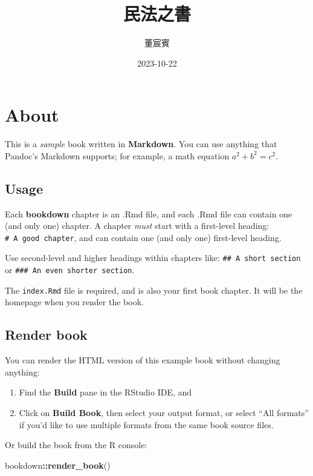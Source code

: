 \documentclass[
]{book}
\title{民法之書}
\author{董宸賓}
\date{2023-10-22}
\newenvironment{Shaded}{\begin{snugshade}}{\end{snugshade}}
\newcommand{\FunctionTok}[1]{\textcolor[rgb]{0.13,0.29,0.53}{\textbf{#1}}}
\newcommand{\NormalTok}[1]{#1}
\newcommand{\SpecialCharTok}[1]{\textcolor[rgb]{0.81,0.36,0.00}{\textbf{#1}}}
\begin{document}
\maketitle

{
\setcounter{tocdepth}{1}
\tableofcontents
}
\hypertarget{about}{%
\chapter{About}\label{about}}

This is a \emph{sample} book written in \textbf{Markdown}. You can use anything that Pandoc's Markdown supports; for example, a math equation \(a^2 + b^2 = c^2\).

\hypertarget{usage}{%
\section{Usage}\label{usage}}

Each \textbf{bookdown} chapter is an .Rmd file, and each .Rmd file can contain one (and only one) chapter. A chapter \emph{must} start with a first-level heading: \texttt{\#\ A\ good\ chapter}, and can contain one (and only one) first-level heading.

Use second-level and higher headings within chapters like: \texttt{\#\#\ A\ short\ section} or \texttt{\#\#\#\ An\ even\ shorter\ section}.

The \texttt{index.Rmd} file is required, and is also your first book chapter. It will be the homepage when you render the book.

\hypertarget{render-book}{%
\section{Render book}\label{render-book}}

You can render the HTML version of this example book without changing anything:

\begin{enumerate}
\def\labelenumi{\arabic{enumi}.}
\item
  Find the \textbf{Build} pane in the RStudio IDE, and
\item
  Click on \textbf{Build Book}, then select your output format, or select ``All formats'' if you'd like to use multiple formats from the same book source files.
\end{enumerate}

Or build the book from the R console:

\begin{Shaded}
\begin{Highlighting}[]
\NormalTok{bookdown}\SpecialCharTok{::}\FunctionTok{render\_book}\NormalTok{()}
\end{Highlighting}
\end{Shaded}
\end{document}
